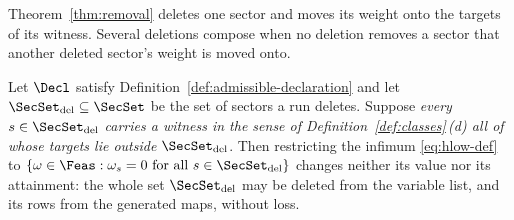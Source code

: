 
Theorem~\ref{thm:removal} deletes one sector and moves its weight onto the
targets of its witness. Several deletions compose when no deletion removes a
sector that another deleted sector's weight is moved onto.

\begin{proposition}
\label{prop:removal-compose}
Let $\Decl$ satisfy Definition~\ref{def:admissible-declaration} and let
$\SecSet_{\mathrm{del}}\subseteq\SecSet$ be the set of sectors a run
deletes. Suppose \emph{every $s\in\SecSet_{\mathrm{del}}$
carries a witness in the sense of Definition~\ref{def:classes}\,(d) all of
whose targets lie outside $\SecSet_{\mathrm{del}}$}. Then restricting the
infimum \eqref{eq:hlow-def} to
$\{\omega\in\Feas:\omega_s=0\ \text{for all }s\in\SecSet_{\mathrm{del}}\}$
changes neither its value nor its attainment: the whole set
$\SecSet_{\mathrm{del}}$ may be deleted from the variable list, and its
rows from the generated maps, without loss.
\end{proposition}

